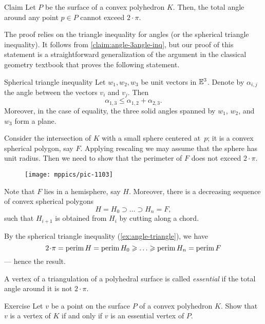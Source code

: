 \begin{thm}{Claim}\label{clm:total-angle}
Let $P$ be the surface of a convex polyhedron $K$.
Then, the total angle around any point $p\in P$ cannot exceed $2\cdot\pi$.
\end{thm}

The proof relies on the triangle inequality for angles (or the spherical triangle inequality).
It follows from \ref{claim:angle-3angle-inq}, but our proof of this statement is a straightforward generalization of the argument in the classical geometry textbook \cite[§ 47]{kiselev-stereo-en} that proves the following statement.

\begin{thm}{Spherical triangle inequality}\label{ex:angle-triangle}
Let $w_1,w_2,w_3$ be unit vectors in $\mathbb{E}^3$.
Denote by $\alpha_{i,j}$ the angle between the vectors $v_i$ and $v_j$.
Then
$$\alpha_{1,3}\le \alpha_{1,2}+\alpha_{2,3}.$$
Moreover, in the case of equality, the three solid angles spanned by $w_1$, $w_2$, and $w_3$ form a plane.
\end{thm}

Consider the intersection of $K$ with a small sphere centered at~$p$;
it is a convex spherical polygon, say $F$.
Applying rescaling we may assume that the sphere has unit radius.
Then we need to show that the perimeter of $F$ does not exceed $2\cdot\pi$.

\begin{wrapfigure}{o}{22mm}
\vskip-4mm
\centering
\texttt{[image: mppics/pic-1103]}
\end{wrapfigure}

Note that $F$ lies in a hemisphere, say $H$.
Moreover, there is a decreasing sequence of convex spherical polygons
\[H=H_0\supset\dots\supset H_n=F,\]
such that $H_{i+1}$ is obtained from $H_{i}$ by cutting along a chord.

By the spherical triangle inequality (\ref{ex:angle-triangle}), we have
\[
2\cdot\pi=\perim H=\perim H_0\ge\dots\ge\perim H_n=\perim F
\]
--- hence the result.
\qedsf

A vertex of a triangulation of a polyhedral surface is called \emph{essential} if the total angle around it is not $2\cdot\pi$.

\begin{thm}{Exercise}\label{ex:vertex-essential-vertex}
Let $v$ be a point on the surface $P$ of a convex polyhedron $K$.
Show that $v$ is a vertex of $K$ if and only if
$v$ is an essential vertex of $P$.
\end{thm}


